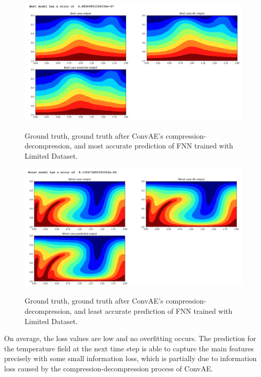 \begin{figure}[H]
    \caption{Ground truth, ground truth after ConvAE's compression-decompression, and most accurate prediction of FNN trained with Limited Dataset.}
    \includegraphics[scale=0.5]{figures/mantle_convection_images/limited_dataset/FNN_Best.png}
    \label{figure:FNN_limited_best}
\end{figure}

\begin{figure}[H]
    \caption{Ground truth, ground truth after ConvAE's compression-decompression, and least accurate prediction of FNN trained with Limited Dataset.}
    \includegraphics[scale=0.5]{figures/mantle_convection_images/limited_dataset/FNN_Worst.png}
    \label{figure:FNN_limited_worst}
\end{figure}

On average, the loss values are low and no overfitting occurs. The prediction for the temperature field at the next time step is able to capture the main features precisely with some small information loss, which is partially due to information loss caused by the compression-decompression process of ConvAE.

